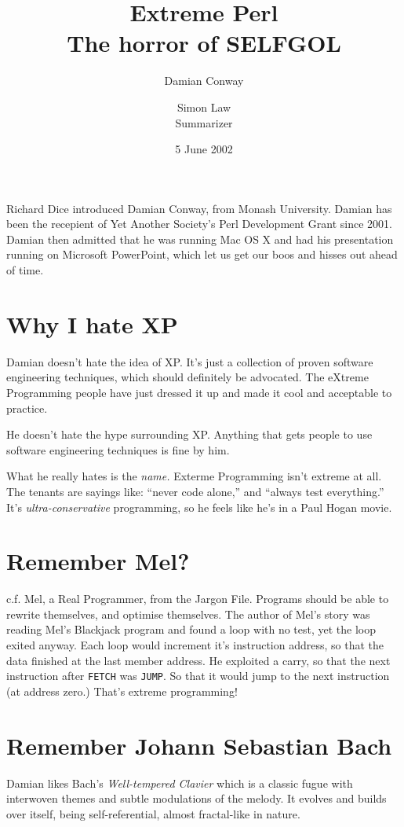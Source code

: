 \documentclass{article}
\title{Extreme Perl\\{\Large The horror of SELFGOL}}
\author{Damian Conway \and Simon Law\\Summarizer}
\date{5 June 2002}
\begin{document}
\maketitle

\noindent Richard Dice introduced Damian Conway, from Monash University.
Damian has been the recepient of Yet Another Society's Perl Development
Grant since 2001.  Damian then admitted that he was running Mac OS X and
had his presentation running on Microsoft PowerPoint, which let us get
our boos and hisses out ahead of time.

\section{Why I hate XP}
Damian doesn't hate the idea of XP.  It's just a collection of proven
software engineering techniques, which should definitely be advocated.
The eXtreme Programming people have just dressed it up and made it
cool and acceptable to practice.

He doesn't hate the hype surrounding XP.  Anything that gets people to
use software engineering techniques is fine by him.

What he really hates is the \emph{name.}  Exterme Programming isn't
extreme at all.  The tenants are sayings like: 
``never code alone,'' and ``always test everything.''  It's
\emph{ultra-conservative} programming, so he feels like he's in a Paul Hogan
movie.

\section{Remember Mel?}
c.f. Mel, a Real Programmer, from the Jargon File.  Programs should be
able to rewrite themselves, and optimise themselves.  The author of
Mel's story was reading Mel's Blackjack program and found a
loop with no test, yet the loop exited anyway.  Each loop would
increment it's instruction address, so that the data finished at the
last member address.  He exploited a carry, so that the next instruction
after \texttt{FETCH} was \texttt{JUMP}.  So that it would jump to the 
next instruction (at address zero.)  That's extreme programming!

\section{Remember Johann Sebastian Bach}
Damian likes Bach's \emph{Well-tempered Clavier} which is a classic fugue with
interwoven themes and subtle modulations of the melody.   It evolves and
builds over itself, being self-referential, almost fractal-like in
nature.
\end{document}
